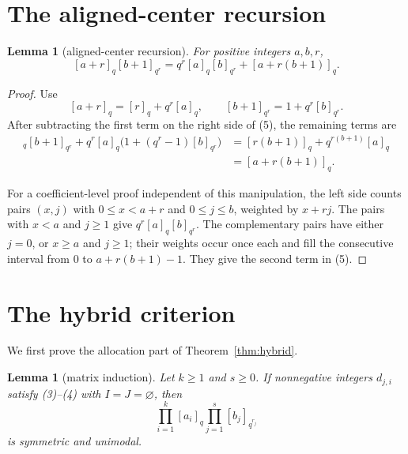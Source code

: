\documentclass[11pt]{article}
\newtheorem{lemma}[theorem]{Lemma}
\begin{document}
\section{The aligned-center recursion}

\begin{lemma}[aligned-center recursion]\label{lem:recursion}
For positive integers \(a,b,r\),
\[
 [a+r]_q[b+1]_{q^r}
 =q^r[a]_q[b]_{q^r}+[a+r(b+1)]_q.                  \tag{5}
\]
\end{lemma}

\begin{proof}
Use
\[
 [a+r]_q=[r]_q+q^r[a]_q,
 \qquad
 [b+1]_{q^r}=1+q^r[b]_{q^r}.
\]
After subtracting the first term on the right side of (5), the remaining
terms are
\begin{align*}
 [r]_q[b+1]_{q^r}+q^r[a]_q
       \bigl(1+(q^r-1)[b]_{q^r}\bigr)
 &= [r(b+1)]_q+q^{r(b+1)}[a]_q\\
 &= [a+r(b+1)]_q.
\end{align*}

For a coefficient-level proof independent of this manipulation, the left
side counts pairs \((x,j)\) with \(0\leq x<a+r\) and \(0\leq j\leq b\),
weighted by \(x+rj\).  The pairs with \(x<a\) and \(j\geq1\) give
\(q^r[a]_q[b]_{q^r}\).  The complementary pairs have either \(j=0\), or
\(x\geq a\) and \(j\geq1\); their weights occur once each and fill the
consecutive interval from \(0\) to \(a+r(b+1)-1\).  They give the second
term in (5).
\end{proof}

\section{The hybrid criterion}

We first prove the allocation part of Theorem~\ref{thm:hybrid}.

\begin{lemma}[matrix induction]\label{lem:matrix}
Let \(k\geq1\) and \(s\geq0\).  If nonnegative integers \(d_{j,i}\)
satisfy (3)--(4) with \(I=J=\varnothing\), then
\[
 \prod_{i=1}^k[a_i]_q\prod_{j=1}^s[b_j]_{q^{r_j}}
\]
is symmetric and unimodal.
\end{lemma}
\end{document}
